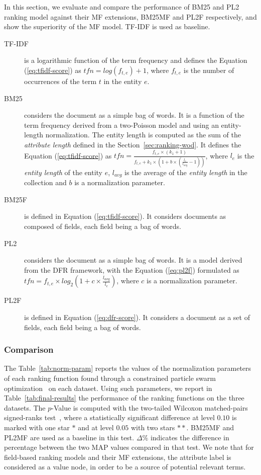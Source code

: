 In this section, we evaluate and compare the performance of BM25 and PL2 ranking model against their MF extensions, BM25MF and PL2F respectively, and show the superiority of the MF model. TF-IDF is used as baseline.

\begin{description}
  \item[TF-IDF] is a logarithmic function of the term frequency and defines the Equation (\ref{eq:tfidf-score}) as 
  $
  tfn=log(f_{t,e})+1
  $,
  where $f_{t,e}$ is the number of occurrences of the term $t$ in the entity $e$.
  \item[BM25~\cite{robertson:1994:sigir}] considers the document as a simple bag of words. It is a function of the term frequency derived from a two-Poisson model and using an entity-length normalization. The entity length is computed as the sum of the \emph{attribute length} defined in the Section~\ref{sec:ranking-wod}. It defines the Equation (\ref{eq:tfidf-score}) as 
  $
  tfn=\frac{f_{t,e}\times(k_1+1)}{f_{t,e}+k_1\times \left(1+b\times\left(\frac{l_e}{l_{avg}}-1\right)\right)}
  $,
where $l_e$ is the \emph{entity length} of the entity $e$, $l_{avg}$ is the average of the \emph{entity length} in the collection and $b$ is a normalization parameter.
  \item[BM25F] is defined in Equation (\ref{eq:tfidf-score}). It considers documents as composed of fields, each field being a bag of words.
  \item[PL2~\cite{amati:2002:acm}] considers the document as a simple bag of words. It is a model derived from the DFR framework, with the Equation (\ref{eq:pl2f}) formulated as 
  $
  tfn=f_{t,e}\times log_2\left(1+c\times\frac{l_{avg}}{l_e}\right)
  $,
  where $c$ is a normalization parameter.
  \item[PL2F] is defined in Equation (\ref{eq:dfr-score}). It considers a document as a set of fields, each field being a bag of words.
\end{description}

\subsubsection{Comparison}

The Table~\ref{tab:norm-param} reports the values of the normalization parameters of each ranking function found through a constrained particle swarm optimization~\cite{xiaohui:2002:sci} on each dataset. Using such parameters, we report in Table~\ref{tab:final-results} the performance of the ranking functions on the three datasets. The $p$-Value is computed with the two-tailed Wilcoxon matched-pairs signed-ranks test~\cite{sheskin:2003:CRC,buttcher:2010:IRI:1869919}, where a statistically significant difference at level $0.10$ is marked with one star $*$ and at level $0.05$ with two stars $**$. BM25MF and PL2MF are used as a baseline in this test. $\Delta\%$ indicates the difference in percentage between the two MAP values compared in that test.
We note that for field-based ranking models and their MF extensions, the attribute label is considered as a value node, in order to be a source of potential relevant terms.

